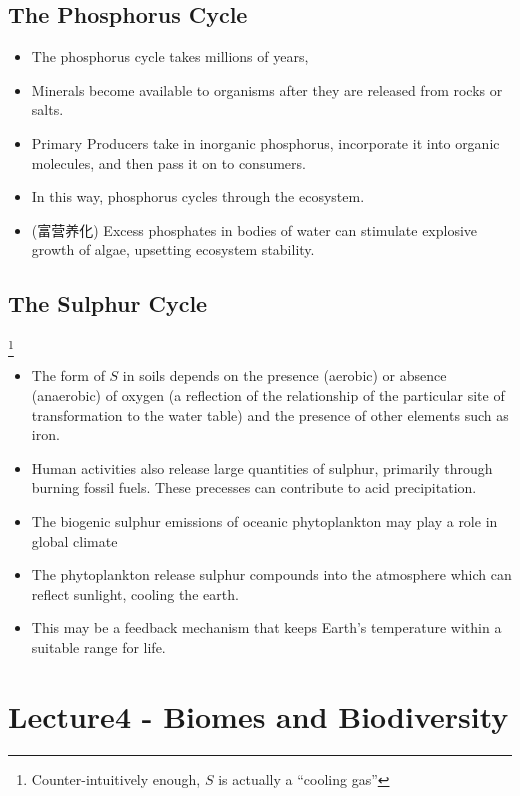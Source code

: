 \documentclass[10pt]{article}
\begin{document}
\subsection{The Phosphorus Cycle}
\begin{itemize}
    \item The phosphorus cycle takes millions of years,
    \item Minerals become available to organisms after they are released from rocks or salts.
    \item Primary Producers take in inorganic phosphorus, incorporate it into organic molecules, and then pass it on to consumers. 
    \item In this way, phosphorus cycles through the ecosystem. 
    \item (富营养化) Excess phosphates in bodies of water can stimulate explosive growth of algae, upsetting ecosystem stability.  
\end{itemize}

\subsection{The Sulphur Cycle}\footnote{Counter-intuitively enough, $S$ is actually a ``cooling gas''}
\begin{itemize}
    \item The form of $S$ in soils depends on the presence (aerobic) or absence (anaerobic) of oxygen (a reflection of the relationship of the particular site of transformation to the water table) and the presence of other elements such as iron. 
    \item Human activities also release large quantities of sulphur, primarily through burning fossil fuels. These precesses can contribute to acid precipitation.
    \item The biogenic sulphur emissions of oceanic phytoplankton may play a role in global climate
    \item The phytoplankton release sulphur compounds into the atmosphere which can reflect sunlight, cooling the earth. 
    \item This may be a feedback mechanism that keeps Earth's temperature within a suitable range for life. 
\end{itemize}



\section{Lecture4 - Biomes and Biodiversity}
\end{document}
